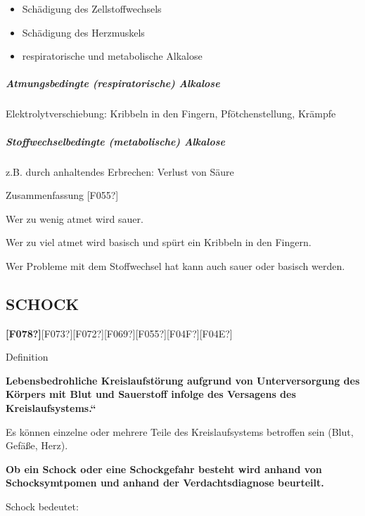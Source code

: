 \documentclass{article}
\newcommand\gEs[1]{\textbf{\textcolor[rgb]{0.0,0.0,0.5019608}{#1}}}
\newcommand\gEs[1]{\textbf{\textcolor[rgb]{0.0,0.0,0.5019608}{#1}}}
\begin{document}
\begin{itemize}
\item {\mdseries
Sch\"adigung des Zellstoffwechsels}

\item {\mdseries
Sch\"adigung des Herzmuskels}

\item {\mdseries
respiratorische und metabolische  Alkalose}

\end{itemize}
\subparagraph[Atmungsbedingte (respiratorische)
Alkalose]{Atmungsbedingte (respiratorische) Alkalose}

{\mdseries
Elektrolytverschiebung: Kribbeln in den Fingern, Pf\"otchenstellung,
Kr\"ampfe}

\subparagraph{Stoffwechselbedingte (metabolische) Alkalose}
{\mdseries
z.B. durch anhaltendes Erbrechen: Verlust von S\"aure}

{\mdseries\color[rgb]{0.0,0.0,0.5019608}
Zusammenfassung [F055?]}

{\mdseries
Wer zu wenig atmet wird sauer.}

{\mdseries
Wer zu viel atmet wird basisch und sp\"urt ein Kribbeln in den Fingern.
}

{\mdseries
Wer Probleme mit dem Stoffwechsel hat kann auch sauer oder basisch
werden.}

\clearpage\setcounter{page}{1}\subsection[SCHOCK ]{SCHOCK }
{\mdseries
[F0EF?][F068?][F0F0?][F0EB?][F0E9?][F0EA?][F0E1?]\textbf{\textcolor[rgb]{0.7882353,0.0,0.08627451}{[F078?]}}[F073?][F072?][F069?][F055?][F04F?][F04E?]}

{\mdseries\color{black}
Definition}

\gEs{{\quotedblbase}Lebensbedrohliche
Kreislaufst\"orung aufgrund von Unterversorgung des K\"orpers mit Blut
und Sauerstoff infolge des Versagens des
Kreislaufsystems.{\textquotedblleft} }

{\mdseries
Es k\"onnen einzelne oder mehrere Teile des Kreislaufsystems betroffen
sein \newline
(Blut, Gef\"a{\ss}e, Herz).}

{\mdseries
\gEs{Ob ein Schock oder eine Schockgefahr besteht
wird anhand von
}\gEs{Schocksymtpomen}\gEs{ und
anhand der
}\gEs{Verdachtsdiagnose}\gEs{
beurteilt.}}

{\mdseries\color{black}
Schock bedeutet:}
\end{document}
